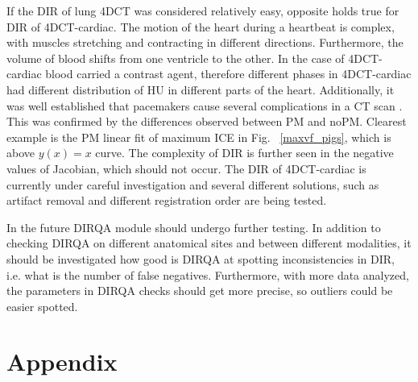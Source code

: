 \documentclass[type=dr, dr=rernat, accentcolor=tud7b,colorbacktitle, bigchapter, openright, twoside, 12pt ]{tudthesis}
\begin{document}
If the DIR of lung 4DCT was considered relatively easy, opposite holds true for DIR of 4DCT-cardiac. The motion of the heart during a heartbeat is complex, 
with muscles stretching \cite{Seeley2007} and contracting in different directions. Furthermore,
the volume of blood shifts from one ventricle to the other. In the case of 4DCT-cardiac blood carried a contrast agent, therefore different phases in 4DCT-cardiac 
had different distribution of HU in different parts of the heart. Additionally, it was well established that pacemakers cause several complications in a CT scan \cite{Mak2012}. This was
confirmed by the differences observed between PM and noPM. Clearest example is the PM linear fit of maximum ICE in Fig.~ \ref{maxvf_pigs}, which is above $y(x) = x$ curve. 
The complexity of DIR is further seen in the negative values of Jacobian, which should not occur. The DIR of 4DCT-cardiac is currently under careful investigation
and several different solutions, such as artifact removal and different registration order are being tested.

In the future DIRQA module should undergo further testing. In addition to checking DIRQA on different anatomical sites and between different modalities, 
it should be investigated how good is DIRQA at spotting inconsistencies in DIR, i.e. what is the number of false negatives. Furthermore, with more
data analyzed, the parameters in DIRQA checks should get more precise, so outliers could be easier spotted.


\section{Appendix}
\label{RegHierarchy}
% 


{}
% 
\end{document}
